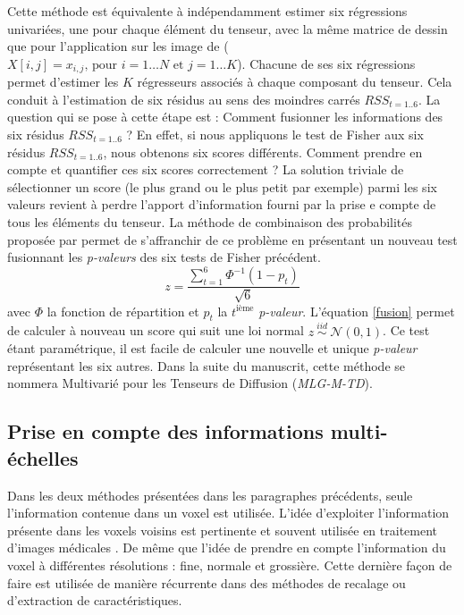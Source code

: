 Cette méthode est équivalente à indépendamment estimer six régressions univariées, une pour chaque élément du tenseur, 
avec la même matrice de dessin que pour l'application sur les image de \fa ($X\left[i,j\right] = x_{i,j} \text{, pour } i = 1\dots N \text{ et } j = 1\dots K$). 
Chacune de ses six régressions permet d'estimer les $K$ régresseurs associés à chaque composant du tenseur.
Cela conduit à l'estimation de six résidus au sens des moindres carrés $RSS_{t=1..6}$.
La question qui se pose à cette étape est : Comment fusionner les informations des six résidus $RSS_{t=1..6}$ ?
En effet, si nous appliquons le test de Fisher aux six résidus $RSS_{t=1..6}$, nous obtenons six scores différents.
Comment prendre en compte et quantifier ces six scores correctement ? 
La solution triviale de sélectionner un score (le plus grand ou le plus petit par exemple)
parmi les six valeurs revient à perdre l'apport d'information fourni par la prise e compte de tous les éléments du tenseur.
La méthode de combinaison des probabilités proposée par \cite{Whitlock2005} permet de s'affranchir de ce problème
en présentant un nouveau test fusionnant les \textit{p-valeurs} des six tests de Fisher précédent.\\
\begin{equation}
    z = \frac{\sum_{t=1}^{6} \Phi^{-1}(1-p_t)}{\sqrt{6}} 
    \label{fusion}
\end{equation}
avec $\Phi$ la fonction de répartition et $p_t$ la $t^\text{ième}$ \textit{p-valeur}.
L'équation \eqref{fusion} permet de calculer à nouveau un score qui suit une loi normal
$z\ \overset{iid}{\sim}\ \mathcal{N}(0, 1)$.
Ce test étant paramétrique, il est facile de calculer une nouvelle et unique \textit{p-valeur} représentant les six autres.
Dans la suite du manuscrit, cette méthode se nommera \mlg Multivarié pour les Tenseurs de Diffusion (\textit{MLG-M-TD}).


\subsection{Prise en compte des informations multi-échelles}
Dans les deux méthodes présentées dans les paragraphes précédents, seule l'information contenue dans un voxel est utilisée.
L'idée d'exploiter l'information présente dans les voxels voisins est pertinente et souvent utilisée en traitement d'images médicales \cite{Grigis2012}.
De même que l'idée de prendre en compte l'information du voxel à différentes résolutions : fine, normale et grossière.
Cette dernière façon de faire est utilisée de manière récurrente dans des méthodes de recalage \cite{Yap2009} ou d'extraction de caractéristiques.

